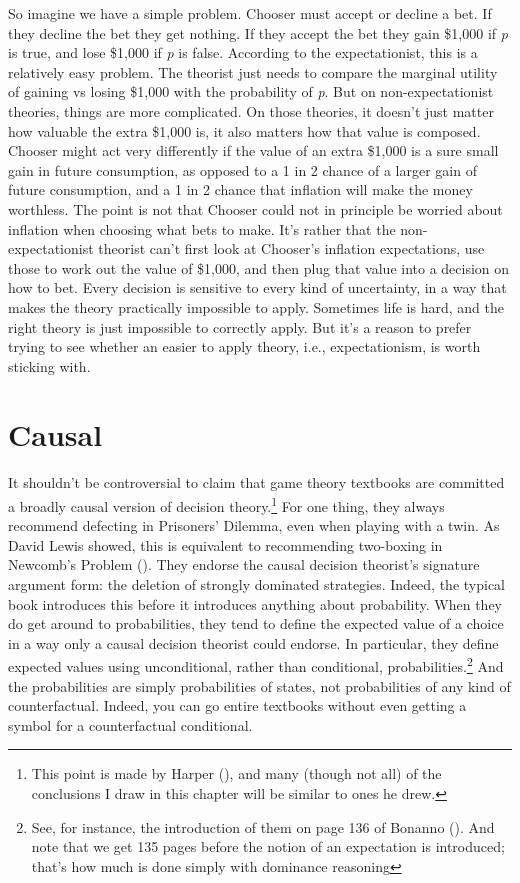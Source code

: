 \documentclass[
  12pt,
  letterpaper,
  DIV=11,
  numbers=noendperiod]{scrreprt}
\begin{document}
So imagine we have a simple problem. Chooser must accept or decline a
bet. If they decline the bet they get nothing. If they accept the bet
they gain \$1,000 if \emph{p} is true, and lose \$1,000 if \emph{p} is
false. According to the expectationist, this is a relatively easy
problem. The theorist just needs to compare the marginal utility of
gaining vs losing \$1,000 with the probability of \emph{p}. But on
non-expectationist theories, things are more complicated. On those
theories, it doesn't just matter how valuable the extra \$1,000 is, it
also matters how that value is composed. Chooser might act very
differently if the value of an extra \$1,000 is a sure small gain in
future consumption, as opposed to a 1 in 2 chance of a larger gain of
future consumption, and a 1 in 2 chance that inflation will make the
money worthless. The point is not that Chooser could not in principle be
worried about inflation when choosing what bets to make. It's rather
that the non-expectationist theorist can't first look at Chooser's
inflation expectations, use those to work out the value of \$1,000, and
then plug that value into a decision on how to bet. Every decision is
sensitive to every kind of uncertainty, in a way that makes the theory
practically impossible to apply. Sometimes life is hard, and the right
theory is just impossible to correctly apply. But it's a reason to
prefer trying to see whether an easier to apply theory, i.e.,
expectationism, is worth sticking with.


\chapter{Causal}\label{sec-causal}

It shouldn't be controversial to claim that game theory textbooks are
committed a broadly causal version of decision theory.\footnote{This
  point is made by Harper (), and many
  (though not all) of the conclusions I draw in this chapter will be
  similar to ones he drew.} For one thing, they always recommend
defecting in Prisoners' Dilemma, even when playing with a twin. As David
Lewis showed, this is equivalent to recommending two-boxing in Newcomb's
Problem (). They endorse the causal
decision theorist's signature argument form: the deletion of strongly
dominated strategies. Indeed, the typical book introduces this before it
introduces anything about probability. When they do get around to
probabilities, they tend to define the expected value of a choice in a
way only a causal decision theorist could endorse. In particular, they
define expected values using unconditional, rather than conditional,
probabilities.\footnote{See, for instance, the introduction of them on
  page 136 of Bonanno (). And note that
  we get 135 pages before the notion of an expectation is introduced;
  that's how much is done simply with dominance reasoning} And the
probabilities are simply probabilities of states, not probabilities of
any kind of counterfactual. Indeed, you can go entire textbooks without
even getting a symbol for a counterfactual conditional.
\end{document}
